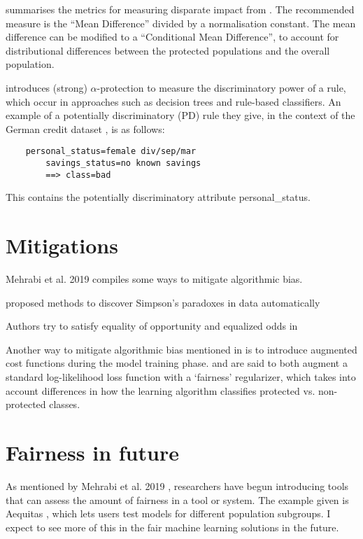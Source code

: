 \documentclass{article}
\begin{document}
\autocite{d_Alessandro_2017} summarises the metrics for measuring disparate impact from \autocite{DBLP:journals/corr/Zliobaite15a}. The recommended measure is the ``Mean Difference'' divided by a normalisation constant. The mean difference can be modified to a ``Conditional Mean Difference'', to account for distributional differences between the protected populations and the overall population.

\autocite{10.1145/1401890.1401959} introduces (strong) $\alpha$-protection to measure the discriminatory power of a rule, which occur in approaches such as decision trees and rule-based classifiers. An example of a potentially discriminatory (PD) rule they give, in the context of the German credit dataset \autocite{Dua:2019}, is as follows: 

\begin{lstlisting}
    personal_status=female div/sep/mar 
        savings_status=no known savings 
        ==> class=bad    
\end{lstlisting}

This contains the potentially discriminatory attribute personal\_status.

\section{Mitigations}
Mehrabi et al. 2019 \autocite{DBLP:journals/corr/abs-1908-09635} compiles some ways to mitigate algorithmic bias.

\cite{DBLP:journals/corr/abs-1801-04385, DBLP:journals/corr/abs-1805-03094} proposed methods to discover
Simpson’s paradoxes in data automatically

Authors try to satisfy equality of opportunity and equalized odds in \cite{DBLP:journals/corr/HardtPS16}

Another way to mitigate algorithmic bias mentioned in \autocite{d_Alessandro_2017} is to introduce augmented cost functions during the model training phase. \autocite{article} and \autocite{DBLP:journals/corr/Zliobaite15} are said to both augment a standard log-likelihood loss function with a ‘fairness’ regularizer, which takes into account differences in how the learning algorithm classifies protected vs. non-protected classes.

\section{Fairness in future}
As mentioned by Mehrabi et al. 2019 \autocite{DBLP:journals/corr/abs-1908-09635}, researchers have begun introducing tools that can assess the amount of fairness in a tool or system. The example given is Aequitas \autocite{DBLP:journals/corr/abs-1811-05577}, which lets users test models for different population subgroups. I expect to see more of this in the fair machine learning solutions in the future.

\printbibliography
\end{document}
